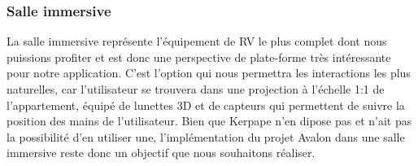 \subsubsection{Salle immersive}
La salle immersive représente l'équipement de RV le plus complet dont nous puissions profiter et est donc une perspective de plate-forme très intéressante pour notre application. C'est l'option qui nous permettra les interactions les plus naturelles, car l'utilisateur se trouvera dans une projection à l'échelle 1:1 de l'appartement, équipé de lunettes 3D et de capteurs qui permettent de suivre la position des mains de l'utilisateur. \newline
Bien que Kerpape n'en dipose pas et n'ait pas la possibilité d'en utiliser une, l'implémentation du projet Avalon dans une salle immersive reste donc un objectif que nous souhaitons réaliser. 